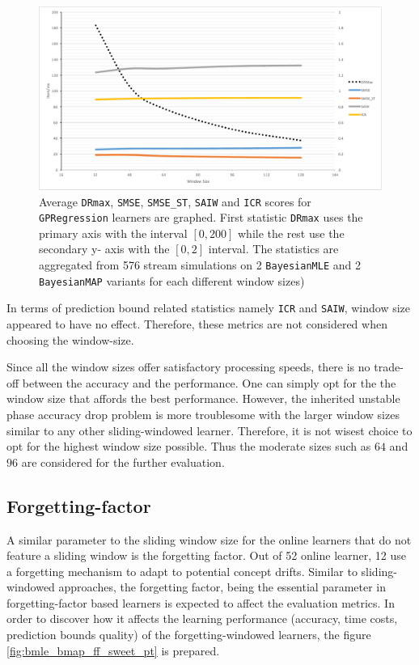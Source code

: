 \begin{figure}[htbp]
  \centering
    \includegraphics[width=\linewidth]{./Figures/bmle_bmap_sweet_pt.pdf}
  \caption{Average \texttt{DRmax}, \texttt{SMSE}, \texttt{SMSE\_ST}, \texttt{SAIW} and \texttt{ICR} scores for \texttt{GPRegression} learners are graphed. First statistic \texttt{DRmax} uses the primary axis with the interval $[0,200]$ while the rest use the secondary y- axis with the $[0,2]$ interval. The statistics are aggregated from 576 stream simulations on 2 \texttt{BayesianMLE} and 2 \texttt{BayesianMAP} variants for each different window sizes)}
  \label{fig:gpreg_wsize_sweet_pt}
\end{figure}

In terms of prediction bound related statistics namely \texttt{ICR} and \texttt{SAIW}, window size appeared to have no effect. Therefore, these metrics are not considered when choosing the window-size.

Since all the window sizes offer satisfactory processing speeds, there is no trade-off between the accuracy and the performance. One can simply opt for the the window size that affords the best performance. However, the inherited unstable phase accuracy drop problem is more troublesome with the larger window sizes similar to any other sliding-windowed learner. Therefore, it is not wisest choice to opt for the highest window size possible. Thus the moderate sizes such as $64$ and $96$ are considered for the further evaluation.

\subsection{Forgetting-factor}

A similar parameter to the sliding window size for the online learners that do not feature a sliding window is the forgetting factor. Out of 52 online learner, 12 use a forgetting mechanism to adapt to potential concept drifts. Similar to sliding-windowed approaches, the forgetting factor, being the essential parameter in forgetting-factor based learners is expected to affect the evaluation metrics. In order to discover how it affects the learning performance (accuracy, time costs, prediction bounds quality) of the forgetting-windowed learners, the figure \ref{fig:bmle_bmap_ff_sweet_pt} is prepared.

